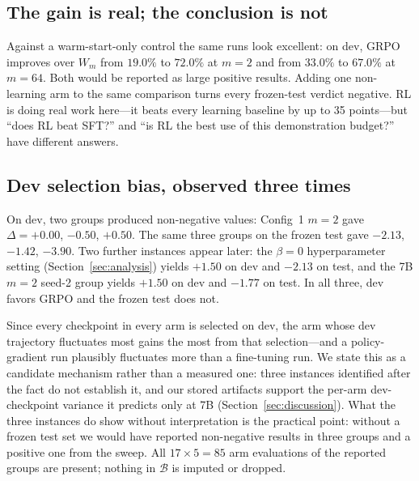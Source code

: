 \subsection{The gain is real; the conclusion is not}

Against a warm-start-only control the same runs look excellent: on dev, GRPO
improves over $W_m$ from $19.0\%$ to $72.0\%$ at $m{=}2$ and from $33.0\%$ to
$67.0\%$ at $m{=}64$. Both would be reported as large positive results. Adding
one non-learning arm to the same comparison turns every frozen-test verdict
negative. RL is doing real work here---it beats every learning baseline by up
to 35 points---but ``does RL beat SFT?'' and ``is RL the best use of this
demonstration budget?'' have different answers.

\subsection{Dev selection bias, observed three times}

On dev, two groups produced non-negative values: Config~1 $m{=}2$ gave
$\Delta = +0.00$, $-0.50$, $+0.50$. The same three groups on the frozen test
gave $-2.13$, $-1.42$, $-3.90$. Two further instances appear later: the
$\beta{=}0$ hyperparameter setting (Section~\ref{sec:analysis}) yields
$+1.50$ on dev and $-2.13$ on test, and the 7B $m{=}2$ seed-2 group yields
$+1.50$ on dev and $-1.77$ on test. In all three, dev favors GRPO and the
frozen test does not.

Since every checkpoint in every arm is selected on dev, the arm whose dev
trajectory fluctuates most gains the most from that selection---and a
policy-gradient run plausibly fluctuates more than a fine-tuning run. We state
this as a candidate mechanism rather than a measured one: three instances
identified after the fact do not establish it, and our stored artifacts support
the per-arm dev-checkpoint variance it predicts only at 7B
(Section~\ref{sec:discussion}). What the three instances do show without
interpretation is the practical point: without a frozen test set we would have
reported non-negative results in three groups and a positive one from the
sweep. All $17 \times 5 = 85$ arm evaluations of the reported groups are
present; nothing in $\mathcal{B}$ is imputed or dropped.


